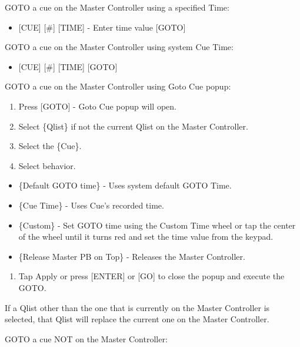 \documentclass[
]{article}
\providecommand{\tightlist}{%
  \setlength{\itemsep}{0pt}\setlength{\parskip}{0pt}}
\begin{document}
GOTO a cue on the Master Controller using a specified Time:

\begin{itemize}
\tightlist
\item
  {[}CUE{]} {[}\#{]} {[}TIME{]} - Enter time value {[}GOTO{]}
\end{itemize}

GOTO a cue on the Master Controller using system Cue Time:

\begin{itemize}
\tightlist
\item
  {[}CUE{]} {[}\#{]} {[}TIME{]} {[}GOTO{]}
\end{itemize}

GOTO a cue on the Master Controller using Goto Cue popup:

\begin{enumerate}
\def\labelenumi{\arabic{enumi}.}
\item
  Press {[}GOTO{]} - Goto Cue popup will open.
\item
  Select \{Qlist\} if not the current Qlist on the Master Controller.
\item
  Select the \{Cue\}.
\item
  Select behavior.
\end{enumerate}

\begin{itemize}
\item
  \{Default GOTO time\} - Uses system default GOTO Time.
\item
  \{Cue Time\} - Uses Cue's recorded time.
\item
  \{Custom\} - Set GOTO time using the Custom Time wheel or tap the center of the wheel until it turns red and set the time value from the keypad.
\item
  \{Release Master PB on Top\} - Releases the Master Controller.
\end{itemize}

\begin{enumerate}
\def\labelenumi{\arabic{enumi}.}
\setcounter{enumi}{4}
\tightlist
\item
  Tap Apply or press {[}ENTER{]} or {[}GO{]} to close the popup and execute the GOTO.
\end{enumerate}

{If a Qlist other than the one that is currently on the Master Controller is selected, that Qlist will replace the current one on the Master Controller.}

GOTO a cue NOT on the Master Controller:
\end{document}
